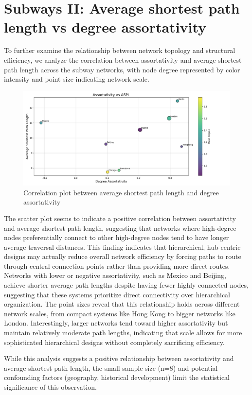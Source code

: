 \section{Subways II: Average shortest path length vs degree assortativity}

To further examine the relationship between network topology and structural efficiency, we analyze the correlation between assortativity and average shortest path length across the subway networks, with node degree represented by color intensity and point size indicating network scale.

\begin{figure}[h!]
    \centering
    \includegraphics[width=0.8\linewidth]{figures/task40_plots/correlation_plot.pdf}
    \caption{Correlation plot between average shortest path length and degree assortativity}
    \label{fig:aspl_vs_assort}
\end{figure}

The scatter plot seems to indicate a positive correlation between assortativity and average shortest path length, suggesting that networks where high-degree nodes preferentially connect to other high-degree nodes tend to have longer average traversal distances. This finding indicates that hierarchical, hub-centric designs may actually reduce overall network efficiency by forcing paths to route through central connection points rather than providing more direct routes. Networks with lower or negative assortativity, such as Mexico and Beijing, achieve shorter average path lengths despite having fewer highly connected nodes, suggesting that these systems prioritize direct connectivity over hierarchical organization. The point sizes reveal that this relationship holds across different network scales, from compact systems like Hong Kong to bigger networks like London. Interestingly, larger networks tend toward higher assortativity but maintain relatively moderate path lengths, indicating that scale allows for more sophisticated hierarchical designs without completely sacrificing efficiency.

While this analysis suggests a positive relationship between assortativity and average shortest path length, the small sample size (n=8) and potential confounding factors (geography, historical development) limit the statistical significance of this observation. 


